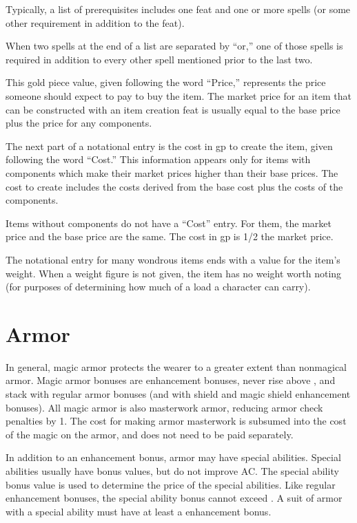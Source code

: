 \begin{itemize*}
Typically, a list of prerequisites includes one feat and one or more spells (or some other requirement in addition to the feat).

When two spells at the end of a list are separated by ``or,'' one of those spells is required in addition to every other spell mentioned prior to the last two.

 This gold piece value, given following the word ``Price,'' represents the price someone should expect to pay to buy the item. The market price for an item that can be constructed with an item creation feat is usually equal to the base price plus the price for any components.

 The next part of a notational entry is the cost in gp to create the item, given following the word ``Cost.'' This information appears only for items with components which make their market prices higher than their base prices. The cost to create includes the costs derived from the base cost plus the costs of the components.

Items without components do not have a ``Cost'' entry. For them, the market price and the base price are the same. The cost in gp is 1/2 the market price.

 The notational entry for many wondrous items ends with a value for the item's weight. When a weight figure is not given, the item has no weight worth noting (for purposes of determining how much of a load a character can carry).
\end{itemize*}

\section{Armor}

In general, magic armor protects the wearer to a greater extent than nonmagical armor. Magic armor bonuses are enhancement bonuses, never rise above , and stack with regular armor bonuses (and with shield and magic shield enhancement bonuses). All magic armor is also masterwork armor, reducing armor check penalties by 1. The cost for making armor masterwork is subsumed into the cost of the magic on the armor, and does not need to be paid separately.

In addition to an enhancement bonus, armor may have special abilities. Special abilities usually  have bonus values, but do not improve AC. The special ability bonus value is used to determine the price of the special abilities. Like regular enhancement bonuses, the special ability bonus cannot exceed . A suit of armor with a special ability must have at least a  enhancement bonus.

